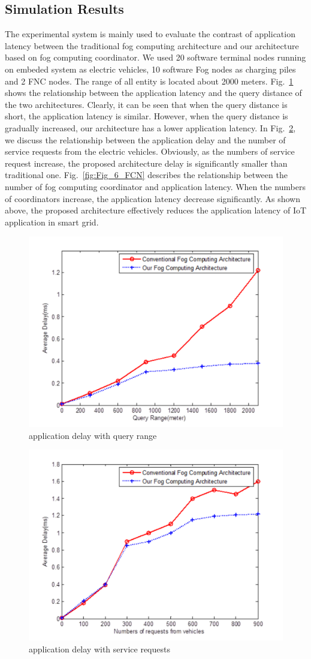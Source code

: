 \documentclass[conference]{IEEEtran}
\begin{document}
\subsection{Simulation Results}
The experimental system is mainly used to evaluate the contrast of application latency between the traditional fog computing architecture and our architecture based on fog computing coordinator. We used 20 software terminal nodes running on embeded system as electric vehicles, 10 software Fog nodes as charging piles and 2 FNC nodes. The range of all entity is located about 2000 meters. Fig.~\ref{fig:Fig_4_queryrange} shows the relationship between the application latency and the query distance of the two architectures. Clearly, it can be seen that when the query distance is short, the application latency is similar. However, when the query distance is gradually increased, our architecture has a lower application latency. In Fig.~\ref{fig:Fig_5_requests}, we discuss the relationship between the application delay and the number of service requests from the electric vehicles. Obviously, as the numbers of service request increase, the proposed architecture delay is significantly smaller than traditional one. Fig.~\ref{fig:Fig_6_FCN} describes the relationship between the number of fog computing coordinator and application latency. When the numbers of coordinators increase, the application latency decrease significantly. As shown above, the proposed architecture effectively reduces the application latency of IoT application in smart grid.
\begin{figure}[h]
	\centering\includegraphics[width=3.4 in]{figures/Fig_4_queryrange} 
	\caption{application delay with query range}\label{fig:Fig_4_queryrange} %
\end{figure}
\begin{figure}[h]
	\centering\includegraphics[width=3.4 in]{figures/Fig_5_requests} 
	\caption{application delay with service requests}\label{fig:Fig_5_requests} %
\end{figure}
\end{document}
